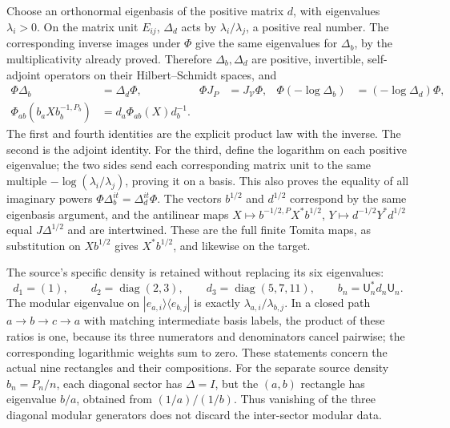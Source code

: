 \documentclass[
  10pt,
  a4paper,
]{article}
\begin{document}
Choose an orthonormal eigenbasis of the positive matrix \(d\), with
eigenvalues \(\lambda_i>0\). On the matrix unit \(E_{ij}\), \(\Delta_d\)
acts by \(\lambda_i/\lambda_j\), a positive real number. The
corresponding inverse images under \(\Phi\) give the same eigenvalues
for \(\Delta_b\), by the multiplicativity already proved. Therefore
\(\Delta_b,\Delta_d\) are positive, invertible, self-adjoint operators
on their Hilbert--Schmidt spaces, and \[
\begin{aligned}
\Phi\Delta_b&=\Delta_d\Phi,&
\Phi J_P&=J_{\mathcal V}\Phi,&
\Phi(-\log\Delta_b)&=(-\log\Delta_d)\Phi,\\
\Phi_{ab}(b_aXb_b^{-1,P_b})&=d_a\Phi_{ab}(X)d_b^{-1}.&&&
\end{aligned}
\tag{ESHL58}
\] The first and fourth identities are the explicit product law with the
inverse. The second is the adjoint identity. For the third, define the
logarithm on each positive eigenvalue; the two sides send each
corresponding matrix unit to the same multiple
\(-\log(\lambda_i/\lambda_j)\), proving it on a basis. This also proves
the equality of all imaginary powers
\(\Phi\Delta_b^{it}=\Delta_d^{it}\Phi\). The vectors \(b^{1/2}\) and
\(d^{1/2}\) correspond by the same eigenbasis argument, and the
antilinear maps \(X\mapsto b^{-1/2,P}X^*b^{1/2}\),
\(Y\mapsto d^{-1/2}Y^*d^{1/2}\) equal \(J\Delta^{1/2}\) and are
intertwined. These are the full finite Tomita maps, as substitution on
\(Xb^{1/2}\) gives \(X^*b^{1/2}\), and likewise on the target.

The source's specific density is retained without replacing its six
eigenvalues: \[
d_1=(1),\qquad d_2=\operatorname{diag}(2,3),\qquad
d_3=\operatorname{diag}(5,7,11),\qquad b_n=\mathsf U_n^*d_n\mathsf U_n.
\tag{ESHL59}
\] The modular eigenvalue on \(|e_{a,i}\rangle\langle e_{b,j}|\) is
exactly \(\lambda_{a,i}/\lambda_{b,j}\). In a closed path
\(a\to b\to c\to a\) with matching intermediate basis labels, the
product of these ratios is one, because its three numerators and
denominators cancel pairwise; the corresponding logarithmic weights sum
to zero. These statements concern the actual nine rectangles and their
compositions. For the separate source density \(b_n=P_n/n\), each
diagonal sector has \(\Delta=I\), but the \((a,b)\) rectangle has
eigenvalue \(b/a\), obtained from \((1/a)/(1/b)\). Thus vanishing of the
three diagonal modular generators does not discard the inter-sector
modular data.
\end{document}

